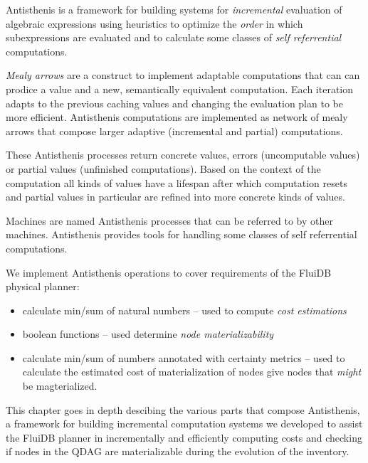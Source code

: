 

\begin{summary}
\item Antisthenis is a framework for building systems for
  \emph{incremental} evaluation of algebraic expressions using
  heuristics to optimize the \emph{order} in which subexpressions are
  evaluated and to calculate some classes of \emph{self referrential}
  computations.
\item \emph{Mealy arrows} are a construct to implement adaptable
  computations that can can prodice a value and a new, semantically
  equivalent computation. Each iteration adapts to the previous
  caching values and changing the evaluation plan to be more
  efficient. Antisthenis computations are implemented as network of
  mealy arrows that compose larger adaptive (incremental and partial)
  computations.
\item These Antisthenis processes return concrete values, errors
  (uncomputable values) or partial values (unfinished
  computations). Based on the context of the computation all kinds of
  values have a lifespan after which computation resets and partial
  values in particular are refined into more concrete kinds of values.
\item Machines are named Antisthenis processes that can be referred to
  by other machines. Antisthenis provides tools for handling some
  classes of self referrential computations.
\item We implement Antisthenis operations to cover requirements of the
  FluiDB physical planner:

  \begin{itemize}
  \item calculate min/sum of natural numbers -- used to compute
    \emph{cost estimations}
  \item boolean functions -- used determine \emph{node materializability}
  \item calculate min/sum of numbers annotated with certainty metrics
    -- used to calculate the estimated cost of materialization of
    nodes give nodes that \emph{might} be magterialized.
  \end{itemize}
\end{summary}

This chapter goes in depth descibing the various parts that compose
Antisthenis, a framework for building incremental computation systems
we developed to assist the FluiDB planner in incrementally and
efficiently computing costs and checking if nodes in the QDAG are
materializable during the evolution of the inventory.

